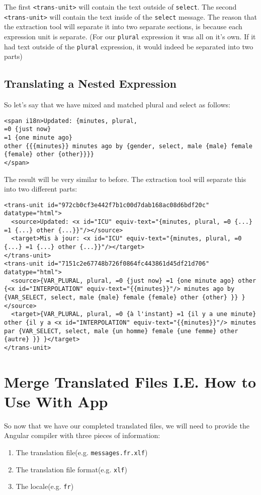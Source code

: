 The first \lstinline{<trans-unit>} will contain the text outside of 
\lstinline{select}. The second \lstinline{<trans-unit>} will contain the text
inside of the \lstinline{select} message. The reason that the extraction tool 
will separate it into two separate sections, is because each expression unit is 
separate. (For our \lstinline{plural} expression it was all on it's own. If it 
had text outside of the \lstinline{plural} expression, it would indeed be 
separated into two parts)

\subsection{Translating a Nested Expression}
So let's say that we have mixed and matched plural and select as follows: 
\begin{lstlisting}
<span i18n>Updated: {minutes, plural,
=0 {just now}
=1 {one minute ago}
other {{{minutes}} minutes ago by {gender, select, male {male} female {female} other {other}}}}
</span>
\end{lstlisting}

The result will be very similar to before. The extraction tool will separate 
this into two different parts: 
\begin{lstlisting}[caption=src/locale/messages.fr.xlf]
<trans-unit id="972cb0cf3e442f7b1c00d7dab168ac08d6bdf20c" datatype="html">
  <source>Updated: <x id="ICU" equiv-text="{minutes, plural, =0 {...} =1 {...} other {...}}"/></source>
  <target>Mis à jour: <x id="ICU" equiv-text="{minutes, plural, =0 {...} =1 {...} other {...}}"/></target>
</trans-unit>
<trans-unit id="7151c2e67748b726f0864fc443861d45df21d706" datatype="html">
  <source>{VAR_PLURAL, plural, =0 {just now} =1 {one minute ago} other {<x id="INTERPOLATION" equiv-text="{{minutes}}"/> minutes ago by {VAR_SELECT, select, male {male} female {female} other {other} }} }</source>
  <target>{VAR_PLURAL, plural, =0 {à l'instant} =1 {il y a une minute} other {il y a <x id="INTERPOLATION" equiv-text="{{minutes}}"/> minutes par {VAR_SELECT, select, male {un homme} female {une femme} other {autre} }} }</target>
</trans-unit>  
\end{lstlisting}

\section{Merge Translated Files I.E. How to Use With App}
So now that we have our completed translated files, we will need to provide the
Angular compiler with three pieces of information: 
\begin{enumerate}
  \item The translation file(e.g. \lstinline{messages.fr.xlf})
  \item The translation file format(e.g. \lstinline{xlf})
  \item The locale(e.g. \lstinline{fr})
\end{enumerate}

